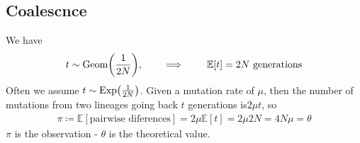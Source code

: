 \documentclass{article}
\newcommand{\expec}{\mathbb{E}}
\begin{document}
        \subsection{Coalescnce}
            We have
            \begin{align}
                t \sim \text{Geom}\qty(\frac{1}{2N}), \qquad \implies \qquad \expec[t] = 2N \text{ generations}
            \end{align}
            Often we assume $t \sim \text{Exp}\qty(\frac{1}{2N})$.  Given a mutation rate of $\mu$, then the number of mutations from two lineages going back $t$ generations is$ 2\mu t$, so
            \begin{align}
                \pi \coloneqq \expec[\text{pairwise diferences}] = 2\mu\expec[t] = 2\mu2N = 4N\mu = \theta
            \end{align}
            $\pi$ is the observation - $\theta$ is the theoretical value.
\end{document}
